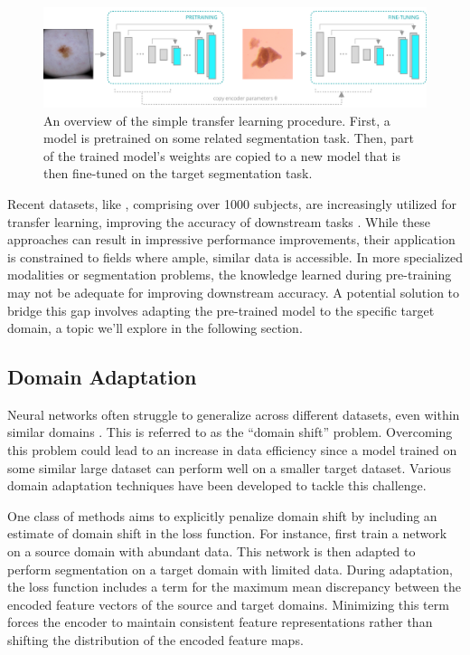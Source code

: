 \begin{figure}[t!]
 \centering
 \includegraphics[width=\linewidth]{images/3/simple-transfer-learning-diagram}
 \caption{An overview of the simple transfer learning procedure. First, a model is pretrained on some related segmentation task. Then, part of the trained model's weights are copied to a new model that is then fine-tuned on the target segmentation task.}
 \label{fig:stl-diagram}
\end{figure}

Recent datasets, like \citet{wasserthalTotalSegmentatorRobustSegmentation2023}, comprising over 1000 subjects, are increasingly utilized for transfer learning, improving the accuracy of downstream tasks \cite{monaiconsortiumMONAIMedicalOpen2023, myronenkoAutomated3DSegmentation2023}. While these approaches can result in impressive performance improvements, their application is constrained to fields where ample, similar data is accessible. In more specialized modalities or segmentation problems, the knowledge learned during pre-training may not be adequate for improving downstream accuracy.  A potential solution to bridge this gap involves adapting the pre-trained model to the specific target domain, a topic we'll explore in the following section.

	\subsection{Domain Adaptation}
	
Neural networks often struggle to generalize across different datasets, even within similar domains \cite{torralbaUnbiasedLookDataset2011}. This is referred to as the ``domain shift'' problem. Overcoming this problem could lead to an increase in data efficiency since a model trained on some similar large dataset can perform well on a smaller target dataset. Various domain adaptation techniques have been developed to tackle this challenge.

One class of methods aims to explicitly penalize domain shift by including an estimate of domain shift in the loss function. For instance, \citet{liuUnsupervisedDeepDomain2018} first train a network on a source domain with abundant data. This network is then adapted to perform segmentation on a target domain with limited data. During adaptation, the loss function includes a term for the maximum mean discrepancy between the encoded feature vectors of the source and target domains. Minimizing this term forces the encoder to maintain consistent feature representations rather than shifting the distribution of the encoded feature maps.

